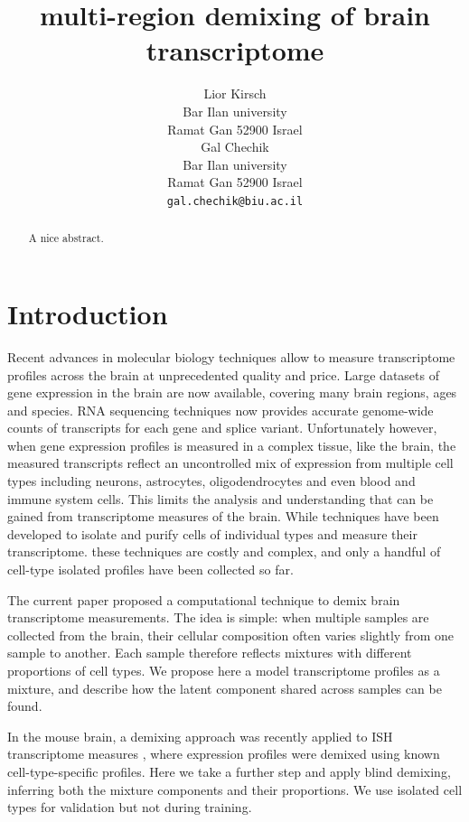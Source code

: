 \documentclass{article} %
\title{multi-region demixing of brain transcriptome}
\author{
Lior Kirsch \\ Bar Ilan university \\ Ramat Gan 52900 Israel \\ 
\And
Gal Chechik \\ Bar Ilan university \\ Ramat Gan 52900 Israel \\
\texttt{gal.chechik@biu.ac.il} \\
}
\begin{document}
\maketitle

\begin{abstract}
A nice abstract.
\end{abstract}

\section{Introduction}
\label{introduction}



Recent advances in molecular biology techniques allow to measure transcriptome profiles across the brain at unprecedented quality and price. Large datasets of gene expression in the brain are now available, covering  many brain regions, ages and species. RNA sequencing techniques now provides accurate genome-wide counts of transcripts for each gene and splice variant. Unfortunately however, when gene expression profiles is measured in a complex tissue, like the brain, the measured transcripts reflect an uncontrolled mix of expression from multiple cell types including neurons, astrocytes, oligodendrocytes and even blood and immune system cells. This limits the analysis and understanding that can be gained from transcriptome measures of the brain. While techniques have been developed to isolate and purify cells of individual types and measure their transcriptome. these techniques are costly and complex, and only a handful of cell-type isolated profiles have been collected so far. 

The current paper proposed a computational technique to demix brain transcriptome measurements. The idea is simple: when multiple samples are collected from the brain, their cellular composition often varies slightly from one sample to another. Each sample therefore reflects mixtures with different proportions of cell types. We propose here a model transcriptome profiles as a mixture, and describe how the latent component shared across samples can be found.

In the mouse brain, a demixing approach was recently applied to ISH transcriptome measures \cite{grange2014cell}, where expression profiles were demixed using known cell-type-specific profiles. Here we take a further step and apply blind demixing, inferring both the mixture components and their proportions. We use isolated cell types for validation but not during training. 
\end{document}

